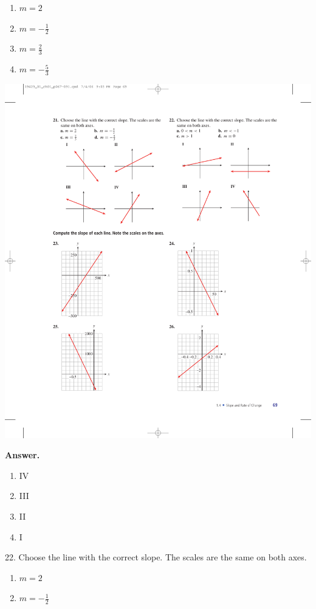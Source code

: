 \documentclass[10pt,]{book}
\theoremstyle{plain}
\theoremstyle{definition}
\theoremstyle{definition}
\theoremstyle{definition}
\theoremstyle{definition}
\numberwithin{equation}{part}
\begin{document}
\begin{exerciselist}
\begin{multicols}{4}
\begin{enumerate}[label=*\alph**]
\item\hypertarget{li-980}{}\(m=2\)%
\item\hypertarget{li-981}{}\(m=-\frac{1}{2} \)%
\item\hypertarget{li-982}{}\(m=\frac{2}{3} \)%
\item\hypertarget{li-983}{}\(m=-\frac{5}{3} \)%
\end{enumerate}
\end{multicols}
 \includegraphics[width=0.6\linewidth]{images/fig-ex-1-4-21}
%
\par\smallskip
\par\smallskip
\noindent\textbf{Answer.}\hypertarget{answer-136}{}\quad
\leavevmode%
\begin{multicols}{4}
\begin{enumerate}[label=*\alph**]
\item\hypertarget{li-984}{}IV%
\item\hypertarget{li-985}{}III%
\item\hypertarget{li-986}{}II%
\item\hypertarget{li-987}{}I%
\end{enumerate}
\end{multicols}
%
\item[22.]\hypertarget{exercise-237}{}Choose the line with the correct slope. The scales are the same on both axes. \leavevmode%
\begin{multicols}{4}
\begin{enumerate}[label=*\alph**]
\item\hypertarget{li-988}{}\(m=2\)%
\item\hypertarget{li-989}{}\(m=-\frac{1}{2} \)%

\end{enumerate}
\end{multicols}
\end{exerciselist}
\end{document}
